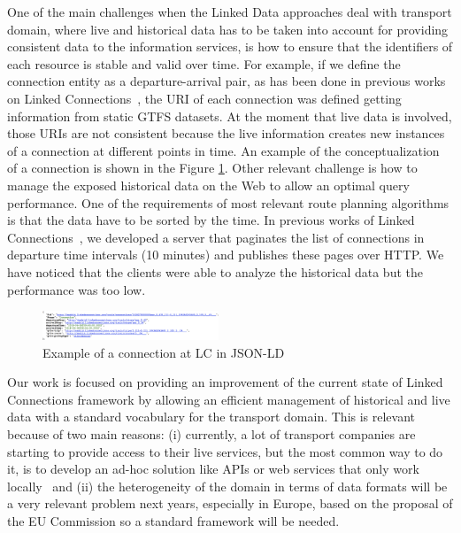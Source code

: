 \documentclass[sw]{iosart2x}
\begin{document}
	One of the main challenges when the Linked Data approaches deal with transport domain, where live and historical data has to be taken into account for providing consistent data to the information services, is how to ensure that the identifiers of each resource is stable and valid over time. For example, if we define the connection entity as a departure-arrival pair, as has been done in previous works on Linked Connections~\cite{colpaert2015intermodal}, the URI of each connection was defined getting information from static GTFS datasets. At the moment that live data is involved, those URIs are not consistent because the live information creates new instances of a connection at different points in time. An example of the conceptualization of a connection is shown in the Figure \ref{fig:connection}. Other relevant challenge is how to manage the exposed historical data on the Web to allow an optimal query performance. One of the requirements of most relevant route planning algorithms is that the data have to be sorted by the time. In previous works of Linked Connections~\cite{rojas2017providing}, we developed a server that paginates the list of connections in departure time intervals (10 minutes) and publishes these pages over HTTP. We have noticed that the clients were able to analyze the historical data but the performance was too low.
	
	\begin{figure}[t]
		\includegraphics[height=0.08\textheight, width=0.47\textwidth]{images/connection.png}
		\caption{Example of a connection at LC in JSON-LD}\label{fig:connection}
	\end{figure}
	
	Our work is focused on providing an improvement of the current state of Linked Connections framework by allowing an efficient management of historical and live data with a standard vocabulary for the transport domain. This is relevant because of two main reasons: (i) currently, a lot of transport companies are starting to provide access to their live services, but the most common way to do it, is to develop an ad-hoc solution like APIs or web services that only work locally~\cite{colpaert2016public} and (ii) the heterogeneity of the domain in terms of data formats will be a very relevant problem next years, especially in Europe, based on the proposal of the EU Commission so a standard framework will be needed.  
	
\end{document}
